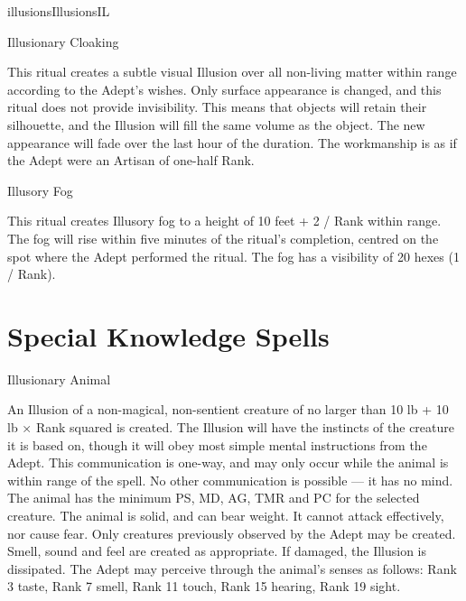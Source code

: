 \begin{College}[1.5]{illusions}{Illusions}{IL}
\begin{ritual}[Q-1]{Illusionary Cloaking}
\begin{effects}
This ritual creates a subtle visual Illusion over all non-living
matter within range according to the Adept’s wishes.  Only surface
appearance is changed, and this ritual does not provide invisibility.
This means that objects will retain their silhouette, and the Illusion
will fill the same volume as the object.  The new appearance will fade
over the last hour of the duration. The workmanship is as if the Adept
were an Artisan of one-half Rank.
\end{effects}
\end{ritual}

\begin{ritual}[Q-2]{Illusory Fog}

\begin{effects}
This ritual creates Illusory fog to a height of 10 feet + 2 / Rank
within range.  The fog will rise within five minutes of the ritual’s
completion, centred on the spot where the Adept performed the ritual.
The fog has a visibility of 20 hexes (1 / Rank).
\end{effects}
\end{ritual}

\section{Special Knowledge Spells}

\begin{spell}[S-1]{Illusionary Animal}

\begin{effects}
An Illusion of a non-magical, non-sentient creature of no larger than
10 lb + 10 lb × Rank squared is created.  The Illusion will have the
instincts of the creature it is based on, though it will obey most
simple mental instructions from the Adept.  This communication is
one-way, and may only occur while the animal is within range of the
spell. No other communication is possible — it has no mind.  The
animal has the minimum PS, MD, AG, TMR and PC for the selected
creature.  The animal is solid, and can bear weight.  It cannot attack
effectively, nor cause fear.  Only creatures previously observed by
the Adept may be created.  Smell, sound and feel are created as
appropriate. If damaged, the Illusion is dissipated. The Adept may
perceive through the animal’s senses as follows: Rank 3 taste, Rank 7
smell, Rank 11 touch, Rank 15 hearing, Rank 19 sight.
\end{effects}
\end{spell}


\end{College}

